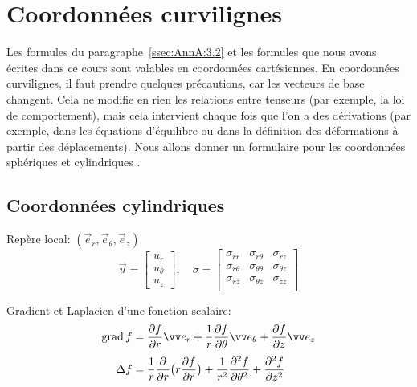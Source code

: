 \section{Coordonnées curvilignes}
Les formules du paragraphe~\ref{ssec:AnnA:3.2} et les formules que nous avons écrites dans ce cours sont valables en coordonnées cartésiennes.
En coordonnées curvilignes, il faut prendre quelques précautions, car les vecteurs de base changent.
Cela ne modifie en rien les relations entre tenseurs (par exemple, la loi de comportement), mais cela intervient chaque fois que l'on a des dérivations (par exemple, dans les équations d'équilibre ou dans la définition des déformations à partir des déplacements).
Nous allons donner un formulaire pour les coordonnées sphériques et cylindriques .
\subsection{Coordonnées cylindriques}
\begin{multicols}{2}
\noindent Repère local: $(\vec{e}_r,\vec{e}_{\theta},\vec{e}_{z})$
    \begin{displaymath}
        \vec{u} = 
        \begin{bmatrix}
            u_r \\
            u_{\theta} \\
            u_z
        \end{bmatrix}, \quad
        \mathbb{\sigma} = 
        \begin{bmatrix}
            \sigma_{rr} & \sigma_{r\theta} & \sigma_{rz} \\
            \sigma_{r\theta} & \sigma_{\theta\theta} & \sigma_{\theta z} \\
            \sigma_{rz} & \sigma_{\theta z} & \sigma_{zz} \\
        \end{bmatrix}
    \end{displaymath}
 
    \columnbreak

    \def\svgheight{3.5cm}
    

\end{multicols}
\noindent Gradient et Laplacien d'une fonction scalaire:
\begin{align*}
    \grad f &= \frac{\partial f}{\partial r} \vec{e}_r + \frac{1}{r} \frac{\partial f}{\partial \theta} \vec{e}_{\theta} + \frac{\partial f}{\partial z} \vec{e}_z \\[3pt]
    \Delta f &= \frac{1}{r} \frac{\partial}{\partial r} \bigl( r \frac{\partial f}{\partial r} \bigr) + \frac{1}{r^{2}}\frac{\partial^2 f}{\partial \theta^2} + \frac{\partial^2 f}{\partial z^2}
\end{align*}
